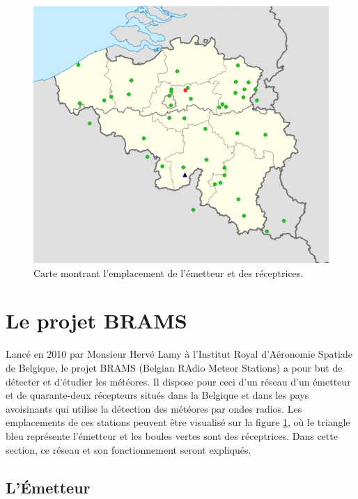 \documentclass[11pt]{article}
\begin{document}
\newpage

\begin{figure}[t]
    \begin{center}
        \includegraphics[scale=0.5]{station_map.png}
        \caption{Carte montrant l'emplacement de l'émetteur et des réceptrices.}
        \label{fig:station_map}
    \end{center}
\end{figure}

\section{Le projet BRAMS}

Lancé en 2010 par Monsieur Hervé Lamy à l'Institut Royal d'Aéronomie Spatiale de Belgique, le projet BRAMS (Belgian RAdio Meteor Stations) a pour but de détecter et d'étudier les météores.
Il dispose pour ceci d'un réseau d'un émetteur et de quarante-deux récepteurs situés dans la Belgique et dans les pays avoisinants qui utilise la détection des météores par ondes radios.
Les emplacements de ces stations peuvent être visualisé sur la figure \ref{fig:station_map}, où le triangle bleu représente l'émetteur et les boules vertes sont des réceptrices.
Dans cette section, ce réseau et son fonctionnement seront expliqués.

\subsection{L'Émetteur}
\end{document}
